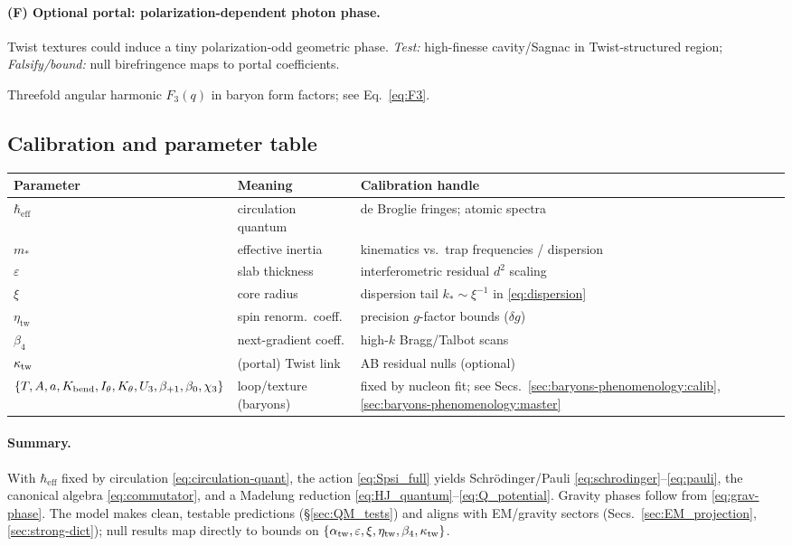 \paragraph{(F) Optional portal: polarization-dependent photon phase.}
Twist textures could induce a tiny polarization-odd geometric phase. \emph{Test:} high-finesse cavity/Sagnac in Twist-structured region; \emph{Falsify/bound:} null birefringence maps to portal coefficients.

Threefold angular harmonic \(F_3(q)\) in baryon form factors; see Eq.~\eqref{eq:F3}.

\subsection{Calibration and parameter table}
\label{sec:QM_calibration}

\begin{center}
\renewcommand{\arraystretch}{1.2}
\begin{tabular}{lll}
\toprule
Parameter & Meaning & Calibration handle \\
\midrule
\(\hbar_{\mathrm{eff}}\) & circulation quantum & de Broglie fringes; atomic spectra \\
\(m_*\) & effective inertia & kinematics vs.\ trap frequencies / dispersion \\
\(\varepsilon\) & slab thickness & interferometric residual \(d^2\) scaling \\
\(\xi\) & core radius & dispersion tail \(k_*\!\sim\!\xi^{-1}\) in \eqref{eq:dispersion} \\
\(\eta_{\mathrm{tw}}\) & spin renorm.\ coeff. & precision \(g\)-factor bounds (\(\delta g\)) \\
\(\beta_4\) & next-gradient coeff. & high-$k$ Bragg/Talbot scans \\
\(\kappa_{\rm tw}\) & (portal) Twist link & AB residual nulls (optional) \\
\(\{T,A,a,K_{\rm bend},I_\theta,K_\theta,U_3,\beta_{+1},\beta_{0},\chi_3\}\) & loop/texture (baryons) & fixed by nucleon fit; see Secs.~\ref{sec:baryons-phenomenology:calib}, \ref{sec:baryons-phenomenology:master} \\
\bottomrule
\end{tabular}
\end{center}

\paragraph{Summary.}
With \(\hbar_{\mathrm{eff}}\) fixed by circulation \eqref{eq:circulation-quant}, the action \eqref{eq:Spsi_full} yields Schr\"odinger/Pauli \eqref{eq:schrodinger}--\eqref{eq:pauli}, the canonical algebra \eqref{eq:commutator}, and a Madelung reduction \eqref{eq:HJ_quantum}--\eqref{eq:Q_potential}. Gravity phases follow from \eqref{eq:grav-phase}. The model makes clean, testable predictions (\S\ref{sec:QM_tests}) and aligns with EM/gravity sectors (Secs.~\ref{sec:EM_projection}, \ref{sec:strong-dict}); null results map directly to bounds on \(\{\alpha_{\rm tw},\varepsilon,\xi,\eta_{\rm tw},\beta_4,\kappa_{\rm tw}\}\).
